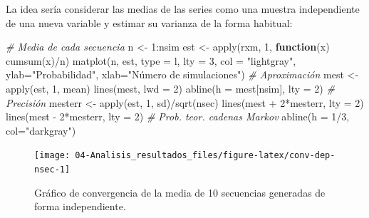 \documentclass[
]{book}
\newenvironment{Shaded}{\begin{snugshade}}{\end{snugshade}}
\newcommand{\AttributeTok}[1]{\textcolor[rgb]{0.77,0.63,0.00}{#1}}
\newcommand{\CommentTok}[1]{\textcolor[rgb]{0.56,0.35,0.01}{\textit{#1}}}
\newcommand{\ControlFlowTok}[1]{\textcolor[rgb]{0.13,0.29,0.53}{\textbf{#1}}}
\newcommand{\DecValTok}[1]{\textcolor[rgb]{0.00,0.00,0.81}{#1}}
\newcommand{\FunctionTok}[1]{\textcolor[rgb]{0.00,0.00,0.00}{#1}}
\newcommand{\NormalTok}[1]{#1}
\newcommand{\OtherTok}[1]{\textcolor[rgb]{0.56,0.35,0.01}{#1}}
\newcommand{\SpecialCharTok}[1]{\textcolor[rgb]{0.00,0.00,0.00}{#1}}
\newcommand{\StringTok}[1]{\textcolor[rgb]{0.31,0.60,0.02}{#1}}
\theoremstyle{break}
\theoremstyle{definition}
\theoremstyle{definition}
\theoremstyle{definition}
\theoremstyle{definition}
\theoremstyle{remark}
\begin{document}
La idea sería considerar las medias de las series como una muestra independiente
de una nueva variable y estimar su varianza de la forma habitual:

\begin{Shaded}
\begin{Highlighting}[]
\CommentTok{\# Media de cada secuencia}
\NormalTok{n }\OtherTok{\textless{}{-}} \DecValTok{1}\SpecialCharTok{:}\NormalTok{nsim}
\NormalTok{est }\OtherTok{\textless{}{-}} \FunctionTok{apply}\NormalTok{(rxm, }\DecValTok{1}\NormalTok{, }\ControlFlowTok{function}\NormalTok{(x) }\FunctionTok{cumsum}\NormalTok{(x)}\SpecialCharTok{/}\NormalTok{n)}
\FunctionTok{matplot}\NormalTok{(n, est, }\AttributeTok{type =} \StringTok{\textquotesingle{}l\textquotesingle{}}\NormalTok{, }\AttributeTok{lty =} \DecValTok{3}\NormalTok{, }\AttributeTok{col =} \StringTok{"lightgray"}\NormalTok{,}
     \AttributeTok{ylab=}\StringTok{"Probabilidad"}\NormalTok{, }\AttributeTok{xlab=}\StringTok{"Número de simulaciones"}\NormalTok{)}
\CommentTok{\# Aproximación}
\NormalTok{mest }\OtherTok{\textless{}{-}} \FunctionTok{apply}\NormalTok{(est, }\DecValTok{1}\NormalTok{, mean)}
\FunctionTok{lines}\NormalTok{(mest, }\AttributeTok{lwd =} \DecValTok{2}\NormalTok{)}
\FunctionTok{abline}\NormalTok{(}\AttributeTok{h =}\NormalTok{ mest[nsim], }\AttributeTok{lty =} \DecValTok{2}\NormalTok{)}
\CommentTok{\# Precisión}
\NormalTok{mesterr }\OtherTok{\textless{}{-}} \FunctionTok{apply}\NormalTok{(est, }\DecValTok{1}\NormalTok{, sd)}\SpecialCharTok{/}\FunctionTok{sqrt}\NormalTok{(nsec)}
\FunctionTok{lines}\NormalTok{(mest }\SpecialCharTok{+} \DecValTok{2}\SpecialCharTok{*}\NormalTok{mesterr, }\AttributeTok{lty =} \DecValTok{2}\NormalTok{)}
\FunctionTok{lines}\NormalTok{(mest }\SpecialCharTok{{-}} \DecValTok{2}\SpecialCharTok{*}\NormalTok{mesterr, }\AttributeTok{lty =} \DecValTok{2}\NormalTok{)}
\CommentTok{\# Prob. teor. cadenas Markov}
\FunctionTok{abline}\NormalTok{(}\AttributeTok{h =} \DecValTok{1}\SpecialCharTok{/}\DecValTok{3}\NormalTok{, }\AttributeTok{col=}\StringTok{"darkgray"}\NormalTok{)     }
\end{Highlighting}
\end{Shaded}

\begin{figure}[!htb]

{\centering \texttt{[image: 04-Analisis\_resultados\_files/figure-latex/conv-dep-nsec-1]} 

}

\caption{Gráfico de convergencia de la media de 10 secuencias generadas de forma independiente.}\label{fig:conv-dep-nsec}
\end{figure}
\end{document}
